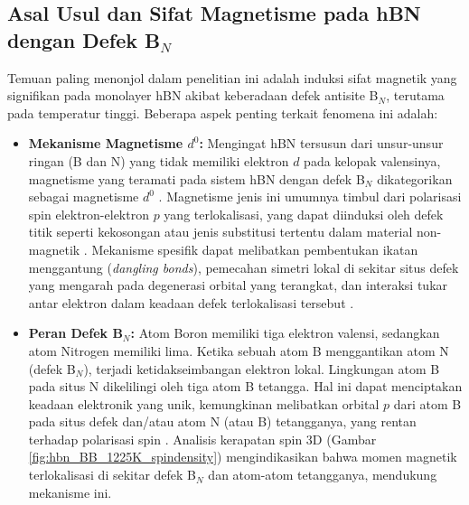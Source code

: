 \subsection{Asal Usul dan Sifat Magnetisme pada hBN dengan Defek B$_N$}
\label{subsec:asal_magnetisme_bn}
Temuan paling menonjol dalam penelitian ini adalah induksi sifat magnetik yang signifikan pada monolayer hBN akibat keberadaan defek antisite B$_N$, terutama pada temperatur tinggi. Beberapa aspek penting terkait fenomena ini adalah:
\begin{itemize}
    \item \textbf{Mekanisme Magnetisme $d^0$:} Mengingat hBN tersusun dari unsur-unsur ringan (B dan N) yang tidak memiliki elektron $d$ pada kelopak valensinya, magnetisme yang teramati pada sistem hBN dengan defek B$_N$ dikategorikan sebagai magnetisme $d^0$ \cite{[1]}. Magnetisme jenis ini umumnya timbul dari polarisasi spin elektron-elektron $p$ yang terlokalisasi, yang dapat diinduksi oleh defek titik seperti kekosongan atau jenis substitusi tertentu dalam material non-magnetik \cite{[1, 1], Zunger2009}. Mekanisme spesifik dapat melibatkan pembentukan ikatan menggantung (\textit{dangling bonds}), pemecahan simetri lokal di sekitar situs defek yang mengarah pada degenerasi orbital yang terangkat, dan interaksi tukar antar elektron dalam keadaan defek terlokalisasi tersebut \cite{[1], Alam2012}.
    \item \textbf{Peran Defek B$_N$:} Atom Boron memiliki tiga elektron valensi, sedangkan atom Nitrogen memiliki lima. Ketika sebuah atom B menggantikan atom N (defek B$_N$), terjadi ketidakseimbangan elektron lokal. Lingkungan atom B pada situs N dikelilingi oleh tiga atom B tetangga. Hal ini dapat menciptakan keadaan elektronik yang unik, kemungkinan melibatkan orbital $p$ dari atom B pada situs defek dan/atau atom N (atau B) tetangganya, yang rentan terhadap polarisasi spin \cite{[1]}. Analisis kerapatan spin 3D (Gambar \ref{fig:hbn_BB_1225K_spindensity}) mengindikasikan bahwa momen magnetik terlokalisasi di sekitar defek B$_N$ dan atom-atom tetangganya, mendukung mekanisme ini.

\end{itemize}
